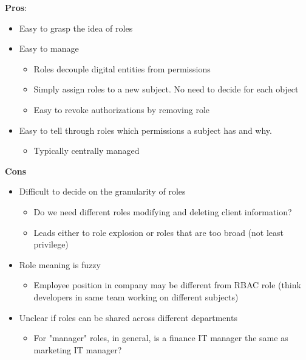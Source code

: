\documentclass[11pt]{article}
\begin{document}
\begin{minipage}{0.4\textwidth}

\textbf{Pros}:
\begin{itemize}
	\item Easy to grasp the idea of roles
	\item Easy to manage
		\begin{itemize}
			\item Roles decouple digital entities from permissions
			\item Simply assign roles to a new subject. No need to decide for each object
			\item Easy to revoke authorizations by removing role
		\end{itemize}
	\item Easy to tell through roles which permissions a subject has and why. 
		\begin{itemize}
			\item Typically centrally managed
		\end{itemize}
\end{itemize}

\end{minipage}
\begin{minipage}{0.6\textwidth}
\textbf{Cons}

\begin{itemize}
	\item Difficult to decide on the granularity of roles
		\begin{itemize}
			\item Do we need different roles modifying and deleting client information?
			\item Leads either to role explosion or roles that are too broad (not least privilege)
		\end{itemize}
	\item Role meaning is fuzzy
		\begin{itemize}
			\item Employee position in company may be different from RBAC role (think developers in same team working on different subjects)
		\end{itemize}
	\item Unclear if roles can be shared across different departments
		\begin{itemize}
			\item For "manager" roles, in general, is a finance IT manager the same as marketing IT manager?
		\end{itemize}
\end{itemize}
\end{minipage}
\end{document}
